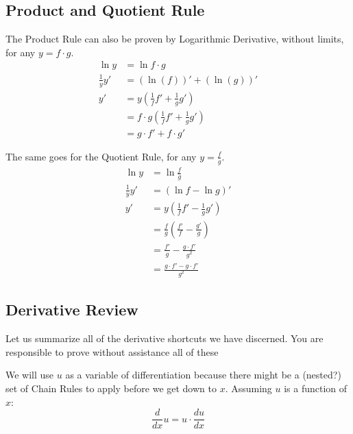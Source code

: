 \subsection{Product and Quotient Rule}
The Product Rule can also be proven by Logarithmic Derivative, without limits, for any 
$y = f\cdot{}g$.
\begin{align*}
\ln{y} &= \ln{f \cdot{} g} \\
\frac{1}{y}y' &= \left(\ln(f)\right)' + \left(\ln(g)\right)' \\
y' &= y(\frac{1}{f}f' + \frac{1}{g}g') \\
 &= f\cdot{}g(\frac{1}{f}f' + \frac{1}{g}g') \\
 &= g\cdot{}f' + f\cdot{}g'
\end{align*}

The same goes for the Quotient Rule, for any $y=\frac{f}{g}$.
\begin{align*}
\ln{y} &= \ln{\frac{f}{g}} \\
\frac{1}{y}y' &= \left(\ln{f} - \ln{g}\right)' \\
y' &= y\left(\frac{1}{f}f' - \frac{1}{g}g'\right) \\
  &= \frac{f}{g}\left(\frac{f'}{f} - \frac{g'}{g}\right) \\
  &= \frac{f'}{g} - \frac{g\cdot{}f'}{g^2}\\
  &= \frac{g\cdot{}f' - g\cdot{}f'}{g^2}
\end{align*}


\subsection{Derivative Review}
Let us summarize all of the derivative shortcuts we have discerned.  You are 
responsible to prove without assistance all of these

We will use $u$ as a variable of differentiation because there might be a
(nested?) set of Chain Rules to apply before we get down to $x$.  Assuming
$u$ is a function of $x$:
\begin{equation}
\frac{d}{dx}u = u\cdot{}\frac{du}{dx}
\end{equation}

